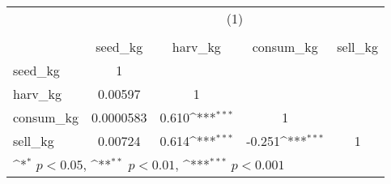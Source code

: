 {
\def\sym#1{\ifmmode^{#1}\else\(^{#1}\)\fi}
\begin{tabular}{l*{4}{c}}
\hline\hline
          &\multicolumn{4}{c}{(1)}                                                    \\
          &\multicolumn{4}{c}{}                                                       \\
          &  seed\_kg         &  harv\_kg         &consum\_kg         &  sell\_kg         \\
\hline
seed\_kg   &        1         &                  &                  &                  \\
harv\_kg   &  0.00597         &        1         &                  &                  \\
consum\_kg &0.0000583         &    0.610\sym{***}&        1         &                  \\
sell\_kg   &  0.00724         &    0.614\sym{***}&   -0.251\sym{***}&        1         \\
\hline\hline
\multicolumn{5}{l}{\footnotesize \sym{*} \(p<0.05\), \sym{**} \(p<0.01\), \sym{***} \(p<0.001\)}\\
\end{tabular}
}
